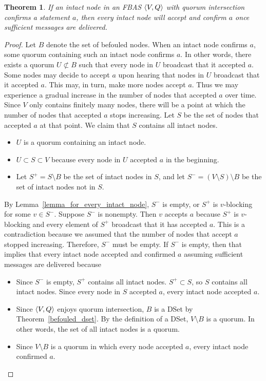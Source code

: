 \documentclass[12pt, psamsfonts]{amsart}
\newtheorem{thm}{Theorem}[subsection]
\theoremstyle{definition}
\theoremstyle{remark}
\numberwithin{equation}{subsection}
\begin{document}
\begin{thm}\label{all_intact_nodes_accept_confirm_same_things}
    If an intact node in an FBAS $\ev{V, Q}$ with quorum intersection confirms a statement $a$, then every intact node will accept and confirm $a$ once sufficient messages are delivered.
\end{thm}

\begin{proof}
    Let $B$ denote the set of befouled nodes.
    When an intact node confirms $a$, some quorum containing such an intact node confirms $a$.
    In other words, there exists a quorum $U \not\subset B$ such that every node in $U$ broadcast that it accepted $a$.
    Some nodes may decide to accept $a$ upon hearing that nodes in $U$ broadcast that it accepted $a$.
    This may, in turn, make more nodes accept $a$.
    Thus we may experience a gradual increase in the number of nodes that accepted $a$ over time.
    Since $V$ only contains finitely many nodes, there will be a point at which the number of nodes that accepted $a$ stops increasing.
    Let $S$ be the set of nodes that accepted $a$ at that point.
    We claim that $S$ contains all intact nodes.

    \begin{itemize}
        \item
            $U$ is a quorum containing an intact node.
        \item
            $U \subset S \subset V$ because every node in $U$ accepted $a$ in the beginning.
        \item
            Let $S^{+} = S \setminus B$ be the set of intact nodes in $S$, and let $S^{-} = (V \setminus S) \setminus B$ be the set of intact nodes not in $S$.
    \end{itemize}
    By Lemma~\ref{lemma_for_every_intact_node}, $S^{-}$ is empty, or $S^{+}$ is $v$-blocking for some $v \in S^{-}$.
    Suppose $S^{-}$ is nonempty.
    Then $v$ accepts $a$ because $S^{+}$ is $v$-blocking and every element of $S^{+}$ broadcast that it has accepted $a$.
    This is a contradiction because we assumed that the number of nodes that accept $a$ stopped increasing.
    Therefore, $S^{-}$ must be empty.
    If $S^{-}$ is empty, then that implies that every intact node accepted and confirmed $a$ assuming sufficient messages are delivered because

    \begin{itemize}
        \item
            Since $S^{-}$ is empty, $S^{+}$ contains all intact nodes.
            $S^{+} \subset S$, so $S$ contains all intact nodes.
            Since every node in $S$ accepted $a$, every intact node accepted $a$.
        \item
            Since $\ev{V, Q}$ enjoys quorum intersection, $B$ is a DSet by Theorem~\ref{befouled_dset}.
            By the definition of a DSet, $V \setminus B$ is a quorum.
            In other words, the set of all intact nodes is a quorum.
        \item
            Since $V \setminus B$ is a quorum in which every node accepted $a$, every intact node confirmed $a$.
    \end{itemize}


\end{proof}
\end{document}
